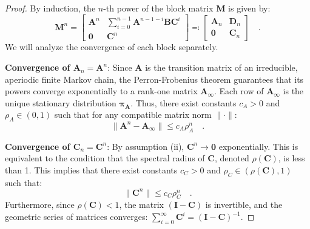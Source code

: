 \documentclass[../../main.tex]{subfiles}
\begin{document}
\begin{proof}
    By induction, the $n$-th power of the block matrix $\bm{M}$ is given by:
    \[
        \bm{M}^n =
        \begin{bmatrix}
        \bm{A}^n & \sum_{i=0}^{n-1} \bm{A}^{n-1-i} \bm{B} \bm{C}^i \\
        \bm{0} & \bm{C}^n
        \end{bmatrix}
        \eqqcolon
        \begin{bmatrix}
        \bm{A}_n & \bm{D}_n \\
        \bm{0} & \bm{C}_n
        \end{bmatrix}
        \quad .
    \]
    We will analyze the convergence of each block separately.

    \textbf{Convergence of $\bm{A}_n = \bm{A}^n$}:
    Since $\bm{A}$ is the transition matrix of an irreducible, aperiodic finite Markov chain, the Perron-Frobenius theorem guarantees that its powers converge exponentially to a rank-one matrix $\bm{A}_\infty$. Each row of $\bm{A}_\infty$ is the unique stationary distribution $\bm{\pi_A}$. Thus, there exist constants $c_A > 0$ and $\rho_A \in (0, 1)$ such that for any compatible matrix norm $\|\cdot\|$:
    \[
        \|\bm{A}^n - \bm{A}_\infty\| \leq c_A \rho_A^n \quad .
    \]

    \textbf{Convergence of $\bm{C}_n = \bm{C}^n$}:
    By assumption (ii), $\bm{C}^n \to \bm{0}$ exponentially. This is equivalent to the condition that the spectral radius of $\bm{C}$, denoted $\rho(\bm{C})$, is less than 1. This implies that there exist constants $c_C > 0$ and $\rho_C \in (\rho(\bm{C}), 1)$ such that:
    \[
        \|\bm{C}^n\| \leq c_C \rho_C^n \quad .
    \]
    Furthermore, since $\rho(\bm{C}) < 1$, the matrix $(\bm{I} - \bm{C})$ is invertible, and the geometric series of matrices converges: $\sum_{i=0}^{\infty} \bm{C}^i = (\bm{I} - \bm{C})^{-1}$.


\end{proof}
\end{document}
